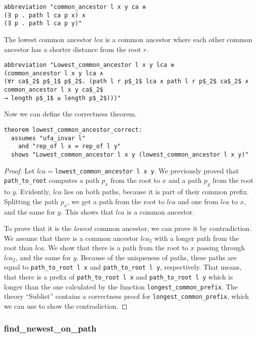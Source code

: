 \begin{lstlisting}
abbreviation "common_ancestor l x y ca ≡
(∃ p . path l ca p x) ∧
(∃ p . path l ca p y)"
\end{lstlisting}

The lowest common ancestor $lca$ is a common ancestor where each other common ancestor has a shorter distance from the root $r$.

\begin{lstlisting}
abbreviation "Lowest_common_ancestor l x y lca ≡
(common_ancestor l x y lca ∧
(∀r ca$_2$ p$_1$ p$_2$. (path l r p$_1$ lca ∧ path l r p$_2$ ca$_2$ ∧ common_ancestor l x y ca$_2$
⟶ length p$_1$ ≥ length p$_2$)))"
\end{lstlisting}

Now we can define the correctness theorem.

\begin{lstlisting}
theorem lowest_common_ancestor_correct:
  assumes "ufa_invar l"
    and "rep_of l x = rep_of l y"
  shows "Lowest_common_ancestor l x y (lowest_common_ancestor l x y)"
\end{lstlisting}

\begin{proof}
Let $lca =$\lstinline{lowest_common_ancestor l x y}. We previously proved that \lstinline{path_to_root} computes a path $p_x$ from the root to $x$ and a path $p_y$ from the root to $y$. Evidently, $lca$ lies on both paths, because it is part of their common prefix. Splitting the path $p_x$, we get a path from the root to $lca$ and one from $lca$ to $x$, and the same for $y$. This shows that $lca$ is a common ancestor.

To prove that it is the \emph{lowest} common ancestor, we can prove it by contradiction. We assume that there is a common ancestor $lca_2$ with a longer path from the root than $lca$. We show that there is a path from the root to $x$ passing through $lca_2$, and the same for $y$. Because of the uniqueness of paths, these paths are equal to \lstinline{path_to_root l x} and \lstinline{path_to_root l y}, respectively. That means, that there is a prefix of \lstinline{path_to_root l x} and \lstinline{path_to_root l y} which is longer than the one calculated by the function \lstinline{longest_common_prefix}. The theory ``Sublist'' contains a correctness proof for \lstinline{longest_common_prefix}, which we can use to show the contradiction.
\end{proof}

\subsubsection{find\_newest\_on\_path}

